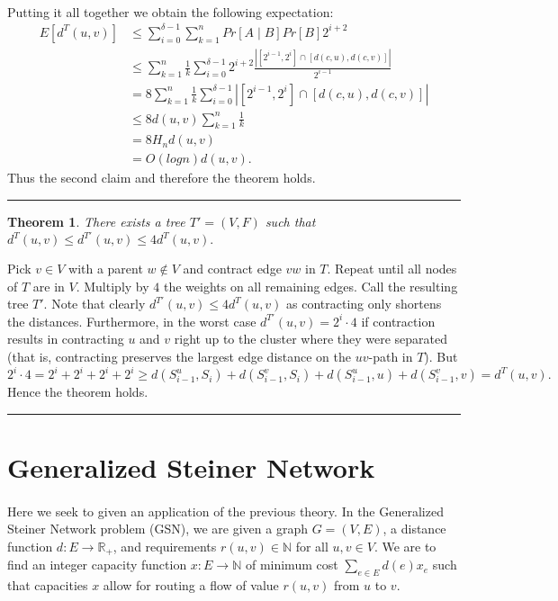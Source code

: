 \documentclass[letterpaper,12pt,oneside,onecolumn]{article}
\newcommand{\N}{\mathbb{N}} \newcommand{\R}{\mathbb{R}}
\newenvironment{proof}{{\bf Proof:  }}{\hfill\rule{2mm}{2mm}}
\newtheorem{theorem}[fact]{Theorem}
\begin{document}
\begin{proof}
\paragraph{}
Putting it all together we obtain the following expectation:
\begin{align*}
E[d^T(u,v)] &\leq \sum_{i=0}^{\delta -1} \sum_{k=1}^n Pr [A \mid B]Pr[B] 2^{i+2} \\
&\leq \sum_{k=1}^n \frac{1}{k} \sum_{i=0}^{\delta -1 }  2^{i+2}\frac{| [2^{i-1},2^i] \cap [d(c,u),d(c,v)]|}{2^{i-1}} \\
&= 8 \sum_{k=1}^n \frac{1}{k} \sum_{i=0}^{\delta -1 }  | [2^{i-1},2^i] \cap [d(c,u),d(c,v)]| \\
&\leq 8 d(u,v) \sum_{k=1}^n \frac{1}{k} \\
&= 8 H_n d(u,v) \\
&= O(log n) d(u,v).
\end{align*}
Thus the second claim and therefore the theorem holds.
\end{proof}
\begin{theorem}
There exists a tree $T' = (V,F)$ such that $d^T(u,v) \leq d^{T'}(u,v) \leq 4 d^T(u,v).$
\end{theorem}
\begin{proof}
Pick $v \in V$ with a parent $w \not \in V$ and contract edge $vw$ in $T$. Repeat until all nodes of $T$ are in $V$. Multiply by $4$ the weights on all remaining edges. Call the resulting tree $T'$. Note that clearly $d^{T'}(u,v) \leq 4d^T(u,v)$ as contracting only shortens the distances. Furthermore, in the worst case $d^{T'}(u,v) = 2^i \cdot 4$ if contraction results in contracting $u$ and $v$ right up to the cluster where they were separated (that is, contracting preserves the largest edge distance on the $uv$-path in $T$). But 
$$2^i \cdot 4 = 2^i + 2^i + 2^i + 2^i \geq d(S^u_{i-1}, S_i) + d(S^v_{i-1}, S_i) +  d(S^u_{i-1}, u) + d(S^v_{i-1}, v) = d^T(u,v).$$
Hence the theorem holds.
\end{proof}
\section{Generalized Steiner Network}
\paragraph{}
Here we seek to given an application of the previous theory. In the Generalized Steiner Network problem (GSN), we are given a graph $G=(V,E)$, a distance function $d: E \rightarrow \R_+$, and requirements $r(u,v) \in \N$ for all $u,v \in V$. We are to find an integer capacity function $x : E \rightarrow \N$ of minimum cost $\sum_{e \in E} d(e) x_e$ such that capacities $x$ allow for routing a flow of value $r(u,v)$ from $u$ to $v$.
\end{document}
